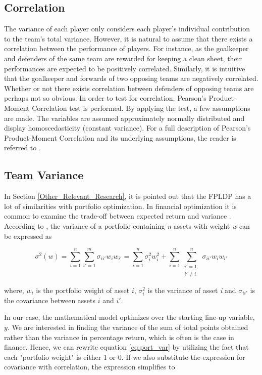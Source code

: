 \subsection{Correlation}
The variance of each player only considers each player's individual contribution to the team's total variance. However, it is natural to assume that there exists a correlation between the performance of players. For instance, as the goalkeeper and defenders of the same team are rewarded for keeping a clean sheet, their performances are expected to be positively correlated. Similarly, it is intuitive that the goalkeeper and forwards of two opposing teams are negatively correlated. Whether or not there exists correlation between defenders of opposing teams are perhaps not so obvious. In order to test for correlation, Pearson's Product-Moment Correlation test is performed. By applying the test, a few assumptions are made. The variables are assumed approximately normally distributed and display homoscedasticity (constant variance). For a full description of Pearson's Product-Moment Correlation and its underlying assumptions, the reader is referred to \cite{laerd}.  \newpar

\subsection{Team Variance}

In Section \ref{Other_Relevant_Research}, it is pointed out that the FPLDP has a lot of similarities with portfolio optimization. In financial optimization it is common to examine the trade-off between expected return and variance \citep{Markowitz}. According to \cite{Zenios}, the variance of a portfolio containing \textit{n} assets with weight \textit{w} can be expressed as 

\begin{equation}
    \sigma^2(w) = \sum_{i = 1}^{n}\sum_{i' = 1}^{m}\sigma_{ii'}w_{i}w_{i'} = \sum_{i = 1}^{n}\sigma_{i}^2w_i^2 + \sum_{i = 1}^{n}\sum_{\substack{i' = 1;\\ i' \neq i}}^{n}\sigma_{ii'}w_iw_{i'}
    \label{eq:port_var}
\end{equation}

where, $w_i$ is the portfolio weight of asset $i$, $\sigma_{i}^2$ is the variance of asset \textit{i} and $\sigma_{ii'}$ is the covariance between assets $i$ and $i'$. 

\newpar

In our case, the mathematical model optimizes over the starting line-up variable, $y$. We are interested in finding the variance of the sum of total points obtained rather than the variance in percentage return, which is often is the case in finance. Hence, we can rewrite equation \ref{eq:port_var} by utilizing the fact that each "portfolio weight" is either 1 or 0. If we also substitute the expression for covariance with correlation, the expression simplifies to

